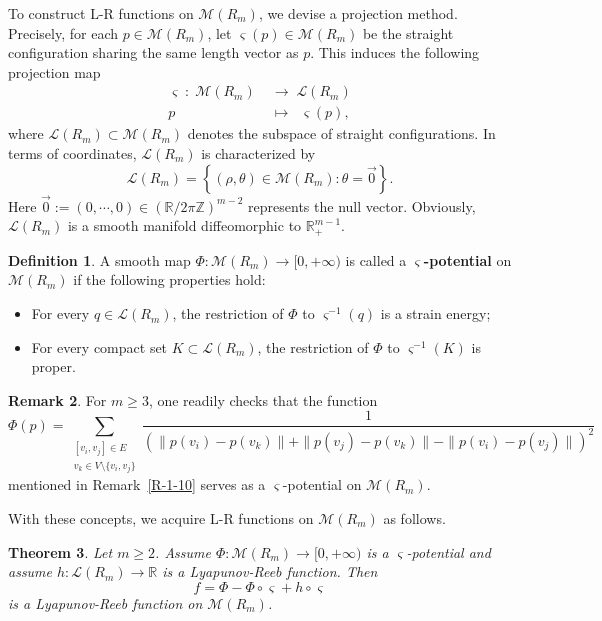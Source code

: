 \documentclass[11pt,letterpaper]{amsart}
\theoremstyle{plain}
\newtheorem{theorem}{Theorem}[section]
\theoremstyle{definition}
\newtheorem{definition}[theorem]{Definition}
\newtheorem{remark}[theorem]{Remark}
\theoremstyle{remark}
\numberwithin{equation}{section}
\begin{document}
To construct L-R functions on $\mathcal M(R_m)$, we devise a projection method. Precisely, for each $p\in \mathcal M(R_m)$, let $\varsigma(p)\in \mathcal M(R_m)$ be the straight configuration sharing the same length vector as $p$. This induces the following projection map
\[
\begin{aligned}
\varsigma\;:\;\mathcal M(R_m)\;&\longrightarrow\;\mathcal L(R_m)\\
p\;\;\;\,&\longmapsto\;\;\varsigma(p),
\end{aligned}
\]
where $\mathcal L(R_m)\subset\mathcal M(R_m)$ denotes the subspace of straight configurations. In terms of coordinates, $\mathcal L(R_m)$ is characterized by
\[
\mathcal L(R_m)=\left\{(\rho,\theta)\in\mathcal M(R_m):\theta=\vec{0}\right\}.
\]
Here $\vec{0}:=(0,\cdots,0)\in \left(\mathbb R/2\pi\mathbb Z\right)^{m-2}$ represents the null vector. Obviously, $\mathcal L(R_m)$ is a smooth manifold diffeomorphic to $\mathbb R_{+}^{m-1}$.

\begin{definition}
A smooth map $\Phi:\mathcal M(R_m)\to [0,+\infty)$ is called a
\textbf{$\varsigma$-potential} on $\mathcal M(R_m)$ if the following properties hold:
\begin{itemize}
\item[\textbf{(a1)}] For every $q\in \mathcal L(R_m)$, the restriction of $\Phi$ to $\varsigma^{-1}(q)$ is a strain energy;
\item[\textbf{(a2)}]For every compact set $K\subset \mathcal L(R_m)$, the restriction of $\Phi$ to $\varsigma^{-1}(K)$ is proper.
\end{itemize}
\end{definition}

\begin{remark}\label{R-3-3}
For $m\geq 3$, one readily checks that the function
\[
\Phi(p)=\sum_{\substack{[v_i,v_j]\in E \\ v_k\in V\setminus\{v_i,v_j\}}}\frac{1}
{\left(\|p(v_i)-p(v_k)\|+\|p(v_j)-p(v_k)\|-\|p(v_i)-p(v_j)\|\right)^2}
\]
mentioned in Remark~\ref{R-1-10} serves as a $\varsigma$-potential on $\mathcal M(R_m)$.
\end{remark}




With these concepts, we acquire L-R functions on
$\mathcal M(R_m)$ as follows.

\begin{theorem}\label{T-3-5}
Let $m\geq 2$. Assume $\Phi:\mathcal M(R_m)\to [0,+\infty)$ is a $\varsigma$-potential and assume $h:\mathcal L(R_m)\to\mathbb R$ is a Lyapunov-Reeb function. Then
\[
f=\Phi-\Phi\circ\varsigma+h\circ\varsigma
\]
is a Lyapunov-Reeb function on $\mathcal M(R_m)$.
\end{theorem}
\end{document}
